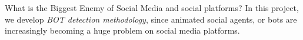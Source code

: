 What is the Biggest Enemy of Social Media and social platforms?  
In this project, we develop {\em BOT detection methodology},
since animated social agents, or bots are increasingly becoming a huge problem on social media platforms.
